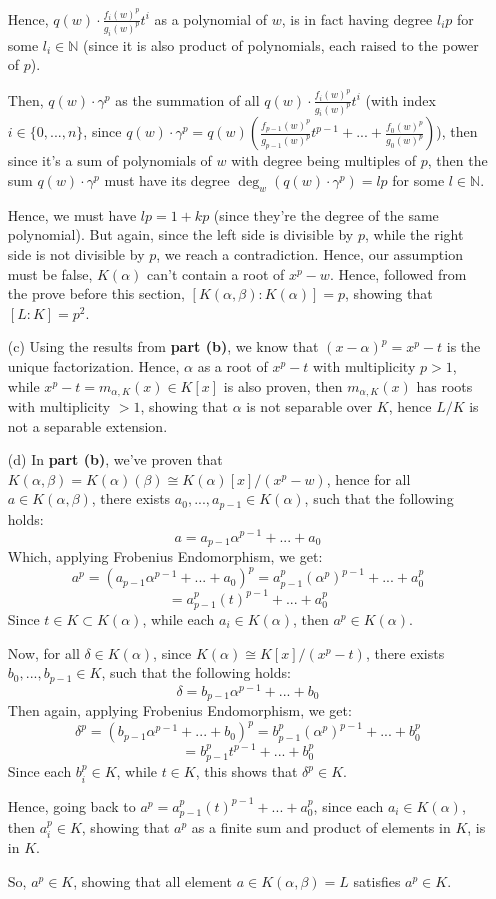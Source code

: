 \documentclass{article}
\begin{document}
\begin{itemize}
    Hence, $q(w)\cdot \frac{f_i(w)^p}{g_i(w)^p}t^i$ as a polynomial of $w$, is in fact having degree $l_ip$ for some $l_i\in\mathbb{N}$ (since it is also product of polynomials, each raised to the power of $p$).

    Then, $q(w)\cdot \gamma^p$ as the summation of all $q(w)\cdot \frac{f_i(w)^p}{g_i(w)^p}t^i$ (with index $i\in \{0,...,n\}$, since $q(w)\cdot \gamma^p = q(w)\left(\frac{f_{p-1}(w)^p}{g_{p-1}(w)^p}t^{p-1}+...+\frac{f_0(w)^p}{g_0(w)^p}\right)$), then since it's a sum of polynomials of $w$ with degree being multiples of $p$, then the sum $q(w)\cdot \gamma^p$ must have its degree $\deg_w(q(w)\cdot \gamma^p) = lp$ for some $l\in\mathbb{N}$.

    Hence, we must have $lp = 1+kp$ (since they're the degree of the same polynomial). But again, since the left side is divisible by $p$, while the right side is not divisible by $p$, we reach a contradiction.
    Hence, our assumption must be false, $K(\alpha)$ can't contain a root of $x^p-w$. Hence, followed from the prove before this section, $[K(\alpha,\beta):K(\alpha)] = p$,
    showing that $[L:K]=p^2$.

    \hfil
    
    \item[(c)] Using the results from \textbf{part (b)}, we know that $(x-\alpha)^p = x^p-t$ is the unique factorization. Hence, $\alpha$ as a root of $x^p-t$ with multiplicity $p>1$, while $x^p-t=m_{\alpha,K}(x)\in K[x]$ is also proven, then $m_{\alpha,K}(x)$ has roots with multiplicity $>1$, showing that $\alpha$ is not separable over $K$, hence $L/K$ is not a separable extension.

    \hfil

    \item[(d)] In \textbf{part (b)}, we've proven that $K(\alpha,\beta)=K(\alpha)(\beta) \cong K(\alpha)[x]/(x^p-w)$, hence for all $a\in K(\alpha,\beta)$, there exists $a_0,...,a_{p-1}\in K(\alpha)$, such that the following holds:
    $$a = a_{p-1}\alpha^{p-1}+...+a_0$$
    Which, applying Frobenius Endomorphism, we get:
    $$a^p = (a_{p-1}\alpha^{p-1}+...+a_0)^p = a_{p-1}^p(\alpha^p)^{p-1}+...+a_0^p$$
    $$ = a_{p-1}^p(t)^{p-1}+...+a_0^p$$
    Since $t\in K\subset K(\alpha)$, while each $a_i\in K(\alpha)$, then $a^p\in K(\alpha)$.

    Now, for all $\delta\in K(\alpha)$, since $K(\alpha)\cong K[x]/(x^p-t)$, there exists $b_0,...,b_{p-1}\in K$, such that the following holds:
    $$\delta = b_{p-1}\alpha^{p-1}+...+b_0$$
    Then again, applying Frobenius Endomorphism, we get:
    $$\delta^p = (b_{p-1}\alpha^{p-1}+...+b_0)^p = b_{p-1}^p(\alpha^p)^{p-1}+...+b_0^p$$
    $$ = b_{p-1}^pt^{p-1}+...+b_0^p$$
    Since each $b_i^p \in K$, while $t\in K$, this shows that $\delta^p \in K$.

    Hence, going back to $a^p = a_{p-1}^p(t)^{p-1}+...+a_0^p$, since each $a_i\in K(\alpha)$, then $a_i^p\in K$, showing that $a^p$ as a finite sum and product of elements in $K$, is in $K$.

    So, $a^p\in K$, showing that all element $a\in K(\alpha,\beta)=L$ satisfies $a^p\in K$.
\end{itemize}
\end{document}
